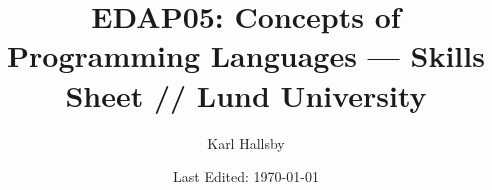 

\usepackage[outputdir=./TeX_Output]{minted} %

% 


\begin{titlepage}
  \title{EDAP05: Concepts of Programming Languages --- Skills Sheet // Lund University}
  \author{Karl Hallsby}
  \date{Last Edited: \today} %
\end{titlepage}


\maketitle
{} %
\tableofcontents
\clearpage
{} %















